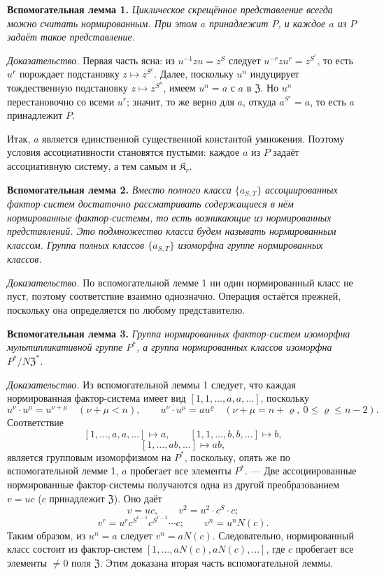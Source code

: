 \documentclass[11pt]{article}
\begin{document}
\noindent\textbf{Вспомогательная лемма 1.} \emph{Циклическое скрещённое представление всегда можно считать нормированным. При этом \(a\) принадлежит \(P\), и каждое \(a\) из \(P\) задаёт такое представление.}

\noindent\emph{Доказательство.} Первая часть ясна: из \(u^{-1}zu=z^S\) следует \(u^{-r}zu^r=z^{S^r}\), то есть \(u^r\) порождает подстановку \(z\mapsto z^{S^r}\). Далее, поскольку \(u^n\) индуцирует тождественную подстановку \(z\mapsto z^{S^n}\), имеем \(u^n=a\) с \(a\) в \(\mathfrak Z\). Но \(u^n\) перестановочно со всеми \(u^r\); значит, то же верно для \(a\), откуда \(a^{S^r}=a\), то есть \(a\) принадлежит \(P\).

Итак, \(a\) является единственной существенной константой умножения. Поэтому условия ассоциативности становятся пустыми: каждое \(a\) из \(P\) задаёт ассоциативную систему, а тем самым и \(\mathfrak K_r\).

\noindent\textbf{Вспомогательная лемма 2.} \emph{Вместо полного класса \(\{a_{S,T}\}\) ассоциированных фактор-систем достаточно рассматривать содержащиеся в нём нормированные фактор-системы, то есть возникающие из нормированных представлений. Это подмножество класса будем называть нормированным классом. Группа полных классов \(\{a_{S,T}\}\) изоморфна группе нормированных классов.}

\noindent\emph{Доказательство.} По вспомогательной лемме 1 ни один нормированный класс не пуст, поэтому соответствие взаимно однозначно. Операция остаётся прежней, поскольку она определяется по любому представителю.

\noindent\textbf{Вспомогательная лемма 3.} \emph{Группа нормированных фактор-систем изоморфна мультипликативной группе \(P^*\), а группа нормированных классов изоморфна \(P^*/N\mathfrak Z^*\).}

\noindent\emph{Доказательство.} Из вспомогательной леммы 1 следует, что каждая нормированная фактор-система имеет вид \([1,1,\ldots,a,a,\ldots]\), поскольку
\[
u^\nu\cdot u^\mu=u^{\nu+\mu}\quad(\nu+\mu<n),
\qquad
u^\nu\cdot u^\mu=au^\varrho\quad(\nu+\mu=n+\varrho,\ 0\leq\varrho\leq n-2).
\]
Соответствие
\[
[1,\ldots,a,a,\ldots]\mapsto a,
\qquad
[1,1,\ldots,b,b,\ldots]\mapsto b,
\]
\[
[1,\ldots,ab,\ldots]\mapsto ab,
\]
является групповым изоморфизмом на \(P^*\), поскольку, опять же по вспомогательной лемме 1, \(a\) пробегает все элементы \(P^*\). --- Две ассоциированные нормированные фактор-системы получаются одна из другой преобразованием \(v=uc\) (\(c\) принадлежит \(\mathfrak Z\)). Оно даёт
\[
v=uc,\qquad v^2=u^2\cdot c^S\cdot c;
\]
\[
v^r=u^r c^{S^{r-1}}c^{S^{r-2}}\cdots c;
\qquad
v^n=u^nN(c).
\]
Таким образом, из \(u^n=a\) следует \(v^n=aN(c)\). Следовательно, нормированный класс состоит из фактор-систем \([1,\ldots,aN(c),aN(c),\ldots]\), где \(c\) пробегает все элементы \(\neq0\) поля \(\mathfrak Z\). Этим доказана вторая часть вспомогательной леммы.
\end{document}

